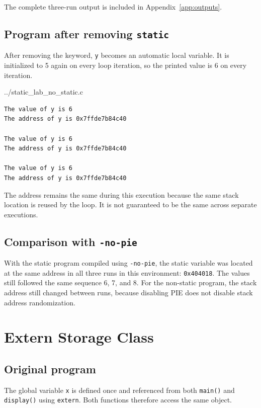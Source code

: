 \documentclass[12pt,a4paper]{article}
\begin{document}
The complete three-run output is included in Appendix~\ref{app:outputs}.

\subsection{Program after removing \texttt{static}}

After removing the keyword, \texttt{y} becomes an automatic local variable.
It is initialized to 5 again on every loop iteration, so the printed value is
6 on every iteration.


{../static_lab_no_static.c}

\begin{lstlisting}[style=terminal,caption={Output after removing static}]
The value of y is 6
The address of y is 0x7ffde7b84c40

The value of y is 6
The address of y is 0x7ffde7b84c40

The value of y is 6
The address of y is 0x7ffde7b84c40
\end{lstlisting}

The address remains the same during this execution because the same stack
location is reused by the loop. It is not guaranteed to be the same across
separate executions.

\subsection{Comparison with \texttt{-no-pie}}

With the static program compiled using \texttt{-no-pie}, the static variable
was located at the same address in all three runs in this environment:
\texttt{0x404018}. The values still followed the same sequence 6, 7, and 8.
For the non-static program, the stack address still changed between runs,
because disabling PIE does not disable stack address randomization.

\section{Extern Storage Class}

\subsection{Original program}

The global variable \texttt{x} is defined once and referenced from both
\texttt{main()} and \texttt{display()} using \texttt{extern}. Both functions
therefore access the same object.
\end{document}
